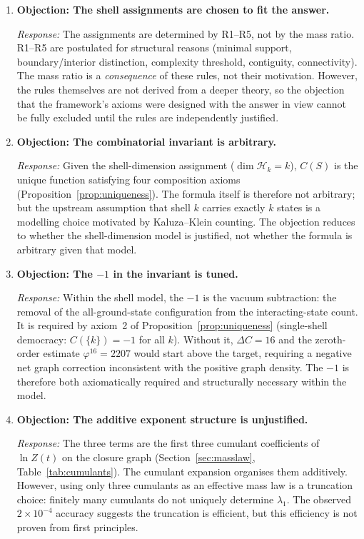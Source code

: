 \documentclass[12pt]{article}
\newcommand{\phig}{\varphi}
\begin{document}
\begin{enumerate}
    \item \textbf{Objection: The shell assignments are chosen to fit the answer.}

    \textit{Response:} The assignments are determined by R1--R5, not by the mass ratio. R1--R5 are postulated for structural reasons (minimal support, boundary/interior distinction, complexity threshold, contiguity, connectivity). The mass ratio is a \textit{consequence} of these rules, not their motivation. However, the rules themselves are not derived from a deeper theory, so the objection that the framework's axioms were designed with the answer in view cannot be fully excluded until the rules are independently justified.

    \item \textbf{Objection: The combinatorial invariant is arbitrary.}

    \textit{Response:} Given the shell-dimension assignment ($\dim \mathcal{H}_k = k$), $C(S)$ is the unique function satisfying four composition axioms (Proposition~\ref{prop:uniqueness}). The formula itself is therefore not arbitrary; but the upstream assumption that shell $k$ carries exactly $k$ states is a modelling choice motivated by Kaluza--Klein counting. The objection reduces to whether the shell-dimension model is justified, not whether the formula is arbitrary given that model.

    \item \textbf{Objection: The $-1$ in the invariant is tuned.}

    \textit{Response:} Within the shell model, the $-1$ is the vacuum subtraction: the removal of the all-ground-state configuration from the interacting-state count. It is required by axiom~2 of Proposition~\ref{prop:uniqueness} (single-shell democracy: $C(\{k\}) = -1$ for all $k$). Without it, $\Delta C = 16$ and the zeroth-order estimate $\phig^{16} = 2207$ would start above the target, requiring a negative net graph correction inconsistent with the positive graph density. The $-1$ is therefore both axiomatically required and structurally necessary within the model.

    \item \textbf{Objection: The additive exponent structure is unjustified.}

    \textit{Response:} The three terms are the first three cumulant coefficients of $\ln Z(t)$ on the closure graph (Section~\ref{sec:masslaw}, Table~\ref{tab:cumulants}). The cumulant expansion organises them additively. However, using only three cumulants as an effective mass law is a truncation choice: finitely many cumulants do not uniquely determine $\lambda_1$. The observed $2 \times 10^{-4}$ accuracy suggests the truncation is efficient, but this efficiency is not proven from first principles.


\end{enumerate}
\end{document}
